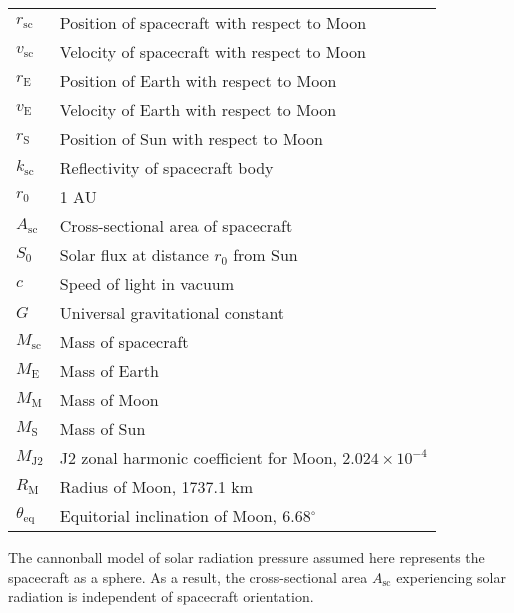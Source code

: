 \documentclass[12pt,letterpaper]{article}
\newcommand{\rsc}{r_{\scriptscriptstyle\text{sc}}}
\newcommand{\vsc}{v_{\scriptscriptstyle\text{sc}}}
\newcommand{\rE}{r_{\scriptscriptstyle\text{E}}}
\newcommand{\rS}{r_{\scriptscriptstyle \text{S}}}
\newcommand{\vE}{v_{\scriptscriptstyle \text{E}}}
\newcommand{\ME}{M_{\scriptscriptstyle \text{E}}}
\newcommand{\MM}{M_{\scriptscriptstyle \text{M}}}
\newcommand{\MS}{M_{\scriptscriptstyle \text{S}}}
\newcommand{\RM}{R_{\scriptscriptstyle \text{M}}}
\newcommand{\MJtwo}{M_{\scriptscriptstyle \text{J2}}}
\newcommand{\thteq}{\theta_{\text{eq}}}
\newcommand{\ksc}{k_{\scriptscriptstyle\text{sc}}}
\newcommand{\Msc}{M_{\scriptscriptstyle\text{sc}}}
\newcommand{\Asc}{A_{\scriptscriptstyle\text{sc}}}
\begin{document}
\begin{table}[!htpb]
\centering
\begin{tabular}{l|l}
\hline
 $\rsc$ & Position of spacecraft with respect to Moon\\   
 $\vsc$ & Velocity of spacecraft with respect to Moon\\
 $\rE$  & Position of Earth with respect to Moon\\
 $\vE$  & Velocity of Earth with respect to Moon\\
 $\rS$  & Position of Sun with respect to Moon\\
 $\ksc$ & Reflectivity of spacecraft body\\ 
 $r_0$  & 1 AU\\
 $\Asc$ & Cross-sectional area of spacecraft\\   
 $S_0$  & Solar flux at distance $r_0$ from Sun\\
 $c$    & Speed of light in vacuum\\
 $G$    & Universal gravitational constant\\
 $\Msc$ & Mass of spacecraft\\
 $\ME$  & Mass of Earth\\
 $\MM$  & Mass of Moon\\
 $\MS$  & Mass of Sun\\
 $\MJtwo$ & J2 zonal harmonic coefficient for Moon, $2.024\times 10^{-4}$\\
 $\RM$    & Radius of Moon, 1737.1 km\\
 $\thteq$ & Equitorial inclination of Moon, 6.68$^\circ$\\
\hline
\end{tabular}
\end{table}

The cannonball model of solar radiation pressure assumed here represents the spacecraft as a sphere. As a result, the cross-sectional area $\Asc$ experiencing solar radiation is independent of spacecraft orientation.

\end{document}
